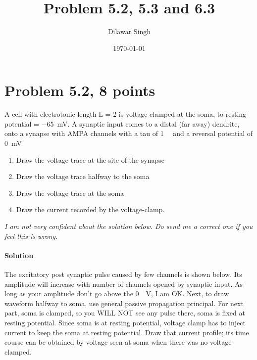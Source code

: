 \documentclass[a4paper,10pt]{article}
\title{Problem 5.2, 5.3 and 6.3}
\author{Dilawar Singh}
\date{\today}
\begin{document}
\maketitle

\section*{Problem 5.2, 8 points}
\label{par:Problem 5.2}

A cell with electrotonic length L = 2 is voltage-clamped at the soma, to resting
potential = \SI{-65}{\milli \volt}. A synaptic input comes to a distal (far away)
dendrite, onto a synapse with AMPA channels with a tau of \SI{1}{\milli \sec} and a reversal
potential of \SI{0}{\milli\volt}

\begin{enumerate}
    \item Draw the voltage trace at the site of the synapse
    \item Draw the voltage trace halfway to the soma
    \item Draw the voltage trace at the soma
    \item Draw the current recorded by the voltage-clamp.
\end{enumerate}

\emph{I am not very confident about the solution below. Do send me a correct one
if you feel this is wrong.}

\paragraph{Solution} The excitatory post synaptic pulse caused by few channels
is shown below. Its amplitude will increase with number of channels opened by
synaptic input. As long as your amplitude don't go above the \SI{0}{\milli
\volt}, I am OK. Next, to draw waveform halfway to soma, use general passive
propagation principal. For next part, soma is clamped, so you WILL NOT see any
pulse there, soma is fixed at resting potential. Since soma is at resting
potential, voltage clamp has to inject current to keep the soma at resting
potential. Draw that current profile; its time course can be obtained by
voltage seen at soma when there was no voltage-clamped.

\par

\end{document}
